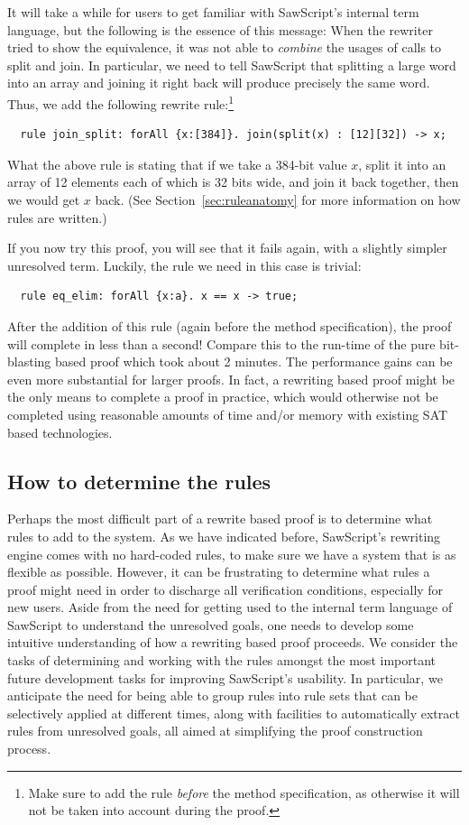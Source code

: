 \documentclass[12pt]{galois-whitepaper}
\newcommand{\sawScript}{{\sc SawScript}\xspace}
\begin{document}
It will take a while for users to get familiar with \sawScript's internal term language, but the following is the essence of this message: When
the rewriter tried to show the equivalence, it was not able to {\em combine} the usages of calls to split and join.
In particular, we need to tell \sawScript that
splitting a large word into an array and joining it right back will produce precisely the same word. Thus, we add the following
rewrite rule:\footnote{Make sure to add the rule {\em before} the method specification, as otherwise it will not be taken into account during the proof.}
\begin{Verbatim}
  rule join_split: forAll {x:[384]}. join(split(x) : [12][32]) -> x;
\end{Verbatim}
What the above rule is stating that if we take a 384-bit value $x$, split it into an array of 12 elements each of which is 32 bits wide, and join it back
together, then we would get $x$ back. (See Section~\ref{sec:ruleanatomy} for more information on how rules are written.)

If you now try this proof, you will see that it fails again, with a slightly simpler unresolved term. Luckily, the rule we need in this case is trivial:
\begin{Verbatim}
  rule eq_elim: forAll {x:a}. x == x -> true;
\end{Verbatim}

After the addition of this rule (again before the method specification),
the proof will complete in less than a second! Compare this to the run-time of the pure bit-blasting based proof
which took about 2 minutes. The performance gains can be even more substantial for larger proofs. In fact, a rewriting
based proof might be the only means to complete a proof in practice, which would otherwise not be completed using reasonable amounts of time and/or memory with
existing SAT based technologies.

\subsection{How to determine the rules}
Perhaps the most difficult part of a rewrite based proof is to determine what rules to add to the system. As we have indicated before, \sawScript's rewriting
engine comes with
no hard-coded rules, to make sure we have a system that is as flexible as possible. However, it can be frustrating to determine what
rules a proof might need in order to discharge all verification conditions, especially for new users.
Aside from the need for getting used to the internal term language of \sawScript to understand
the unresolved goals, one needs to develop some intuitive understanding of how a rewriting based proof proceeds. We consider the tasks of determining and working
with the rules amongst the most important future development tasks for improving \sawScript's usability. In particular, we anticipate the need for being able
to group rules into rule sets that can be selectively applied at different times, along with facilities to automatically extract rules from
unresolved goals, all aimed at simplifying the proof construction process.
\end{document}
